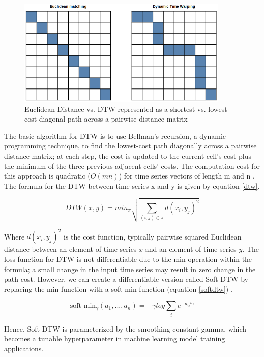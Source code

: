 \documentclass[12pt, letterpaper]{article}
\begin{document}
\begin{figure}[htbp]
\includegraphics[height=2in]{img/euclidean_dtw_matrix.png}
\centering
\caption{Euclidean Distance vs. DTW represented as a shortest
  vs. lowest-cost diagonal path across a pairwise distance matrix}
\label{euclidean_matrix}
\end{figure}

The basic algorithm for DTW is to use Bellman's recursion, a dynamic programming
technique, to find the lowest-cost path diagonally across a pairwise distance
matrix; at each step, the cost is updated to the current cell's cost plus the
minimum of the three previous adjacent cells' costs. The computation cost for
this approach is quadratic ($O(mn)$) for time series vectors of length m and n
\cite{cuturi_soft-dtw_2018}. The formula for the DTW between time series x and y
is given by equation \ref{dtw}.

\begin{equation} \label{dtw}
DTW(x,y) = min_{\pi}\sqrt{\sum_{(i,j)\in\pi}d(x_{i},y_{j})^2}
\end{equation}

Where $d(x_i,y_j)^2$ is the cost function, typically pairwise squared Euclidean
distance between an element of time series $x$ and an element of time series
$y$. The loss function for DTW is not differentiable due to the min operation
within the formula; a small change in the input time series may result in zero
change in the path cost. However, we can create a differentiable version called
Soft-DTW by replacing the min function with a soft-min function (equation
\ref{softdtw}) \cite{cuturi_soft-dtw_2018}.

\begin{equation} \label{softdtw}
\text{soft-min}_\gamma(a_1,...,a_n) = -\gamma log\sum_{i}e^{-a_i/\gamma}
\end{equation}

Hence, Soft-DTW is parameterized by the smoothing constant gamma, which becomes
a tunable hyperparameter in machine learning model training applications.
\end{document}
